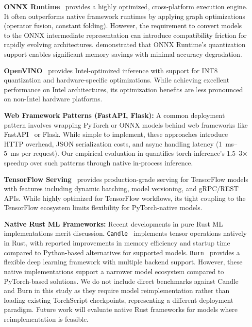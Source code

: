 \documentclass[10pt,twocolumn,a4paper]{article}
\theoremstyle{definition}
\theoremstyle{plain}
\newcommand{\timesX}[1]{#1$\times$}
\begin{document}
\textbf{ONNX Runtime}~\citep{onnxruntime} provides a highly optimized, cross-platform execution engine. It often outperforms native framework runtimes by applying graph optimizations (operator fusion, constant folding). However, the requirement to convert models to the ONNX intermediate representation can introduce compatibility friction for rapidly evolving architectures. \citet{xiao2023smoothquant} demonstrated that ONNX Runtime's quantization support enables significant memory savings with minimal accuracy degradation.

\textbf{OpenVINO}~\citep{openvino} provides Intel-optimized inference with support for INT8 quantization and hardware-specific optimizations. While achieving excellent performance on Intel architectures, its optimization benefits are less pronounced on non-Intel hardware platforms.

\textbf{Web Framework Patterns (FastAPI, Flask):} A common deployment pattern involves wrapping PyTorch or ONNX models behind web frameworks like FastAPI~\citep{fastapi} or Flask. While simple to implement, these approaches introduce HTTP overhead, JSON serialization costs, and async handling latency (\SIrange{1}{5}{\milli\second} per request). Our empirical evaluation in  quantifies torch-inference's \timesX{1.5--3} speedup over such patterns through native in-process inference.

\textbf{TensorFlow Serving}~\citep{tfserving} provides production-grade serving for TensorFlow models with features including dynamic batching, model versioning, and gRPC/REST APIs. While highly optimized for TensorFlow workflows, its tight coupling to the TensorFlow ecosystem limits flexibility for PyTorch-native models.

\textbf{Native Rust ML Frameworks:} Recent developments in pure Rust ML implementations merit discussion. \texttt{Candle}~\citep{candle2023} implements tensor operations natively in Rust, with reported improvements in memory efficiency and startup time compared to Python-based alternatives for supported models. \texttt{Burn}~\citep{burn2023} provides a flexible deep learning framework with multiple backend support. However, these native implementations support a narrower model ecosystem compared to PyTorch-based solutions. We do not include direct benchmarks against Candle and Burn in this study as they require model reimplementation rather than loading existing TorchScript checkpoints, representing a different deployment paradigm. Future work will evaluate native Rust frameworks for models where reimplementation is feasible.
\end{document}
